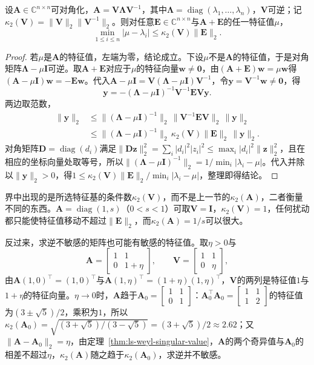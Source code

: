 \begin{theorem}
\label{thm:ls-bauer-fike}
设$\bm A\in\mathbb C^{n\times n}$可对角化，$\bm A=\bm V\bm\Lambda\bm V^{-1}$，其中$\bm\Lambda=\operatorname{diag}(\lambda_1,\ldots,\lambda_n)$，$\bm V$可逆；记$\kappa_2(\bm V)=\lVert\bm V\rVert_2\lVert\bm V^{-1}\rVert_2$。则对任意$\bm E\in\mathbb C^{n\times n}$与$\bm A+\bm E$的任一特征值$\mu$，
\[
 \min_{1\leq i\leq n}|\mu-\lambda_i|\leq\kappa_2(\bm V)\lVert\bm E\rVert_2 .
\]
\end{theorem}
\begin{proof}
若$\mu$是$\bm A$的特征值，左端为零，结论成立。下设$\mu$不是$\bm A$的特征值，于是对角矩阵$\bm\Lambda-\mu\bm I$可逆。取$\bm A+\bm E$对应于$\mu$的特征向量$\bm w\neq\bm0$，由$(\bm A+\bm E)\bm w=\mu\bm w$得$(\bm A-\mu\bm I)\bm w=-\bm E\bm w$。代入$\bm A-\mu\bm I=\bm V(\bm\Lambda-\mu\bm I)\bm V^{-1}$，令$\bm y=\bm V^{-1}\bm w\neq\bm0$，得
\[
 \bm y=-(\bm\Lambda-\mu\bm I)^{-1}\bm V^{-1}\bm E\bm V\bm y .
\]
两边取范数，
\[
 \begin{aligned}
 \lVert\bm y\rVert_2
 &\leq\lVert(\bm\Lambda-\mu\bm I)^{-1}\rVert_2\,\lVert\bm V^{-1}\bm E\bm V\rVert_2\,\lVert\bm y\rVert_2\\
 &\leq\lVert(\bm\Lambda-\mu\bm I)^{-1}\rVert_2\,\kappa_2(\bm V)\lVert\bm E\rVert_2\,\lVert\bm y\rVert_2 .
 \end{aligned}
\]
对角矩阵$\bm D=\operatorname{diag}(d_i)$满足$\lVert\bm D\bm z\rVert_2^2=\sum_i|d_i|^2|z_i|^2\leq\max_i|d_i|^2\lVert\bm z\rVert_2^2$，且在相应的坐标向量处取等号，所以$\lVert(\bm\Lambda-\mu\bm I)^{-1}\rVert_2=1/\min_i|\lambda_i-\mu|$。代入并除以$\lVert\bm y\rVert_2>0$，得$1\leq\kappa_2(\bm V)\lVert\bm E\rVert_2/\min_i|\lambda_i-\mu|$，整理即得结论。
\end{proof}
界中出现的是所选特征基的条件数$\kappa_2(\bm V)$，而不是上一节的$\kappa_2(\bm A)$，二者衡量不同的东西。$\bm A=\operatorname{diag}(1,s)$（$0<s<1$）可取$\bm V=\bm I$，$\kappa_2(\bm V)=1$，任何扰动都只能使特征值移动不超过$\lVert\bm E\rVert_2$，而$\kappa_2(\bm A)=1/s$可以很大。

反过来，求逆不敏感的矩阵也可能有敏感的特征值。取$\eta>0$与
\[
 \bm A=\begin{bmatrix}1&1\\0&1+\eta\end{bmatrix},\qquad
 \bm V=\begin{bmatrix}1&1\\0&\eta\end{bmatrix},
\]
由$\bm A(1,0)^\top=(1,0)^\top$与$\bm A(1,\eta)^\top=(1+\eta)(1,\eta)^\top$，$\bm V$的两列是特征值$1$与$1+\eta$的特征向量。$\eta\to0$时，$\bm A$趋于$\bm A_0=\left[\begin{smallmatrix}1&1\\0&1\end{smallmatrix}\right]$：$\bm A_0^\top\bm A_0=\left[\begin{smallmatrix}1&1\\1&2\end{smallmatrix}\right]$的特征值为$(3\pm\sqrt5)/2$，乘积为$1$，所以$\kappa_2(\bm A_0)=\sqrt{(3+\sqrt5)/(3-\sqrt5)}=(3+\sqrt5)/2\approx2.62$；又$\lVert\bm A-\bm A_0\rVert_2=\eta$，由定理~\ref{thm:ls-weyl-singular-value}，$\bm A$的两个奇异值与$\bm A_0$的相差不超过$\eta$，$\kappa_2(\bm A)$随之趋于$\kappa_2(\bm A_0)$，求逆并不敏感。

